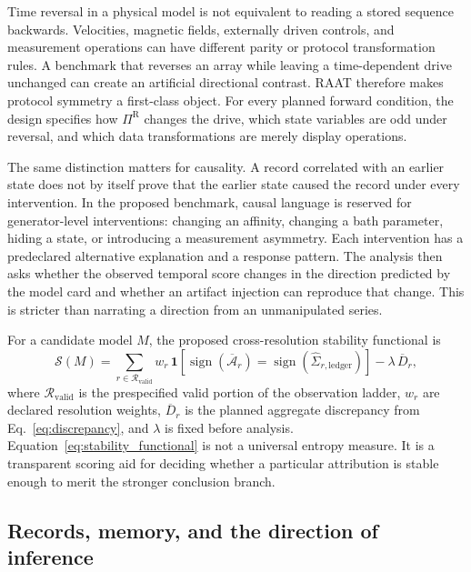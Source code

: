 Time reversal in a physical model is not equivalent to reading a stored sequence backwards. Velocities, magnetic fields, externally driven controls, and measurement operations can have different parity or protocol transformation rules. A benchmark that reverses an array while leaving a time-dependent drive unchanged can create an artificial directional contrast. RAAT therefore makes protocol symmetry a first-class object. For every planned forward condition, the design specifies how $\Pi^{\mathrm{R}}$ changes the drive, which state variables are odd under reversal, and which data transformations are merely display operations.

The same distinction matters for causality. A record correlated with an earlier state does not by itself prove that the earlier state caused the record under every intervention. In the proposed benchmark, causal language is reserved for generator-level interventions: changing an affinity, changing a bath parameter, hiding a state, or introducing a measurement asymmetry. Each intervention has a predeclared alternative explanation and a response pattern. The analysis then asks whether the observed temporal score changes in the direction predicted by the model card and whether an artifact injection can reproduce that change. This is stricter than narrating a direction from an unmanipulated series.

For a candidate model $M$, the proposed cross-resolution stability functional is
\begin{equation}
\mathcal{S}(M)=\sum_{r\in\mathcal{R}_{\mathrm{valid}}}w_r\,\mathbf{1}\!\left[\operatorname{sign}(\overline{\mathcal{A}}_r)=\operatorname{sign}(\widehat{\Sigma}_{r,\mathrm{ledger}})\right]-\lambda\,\overline{D}_r,
\label{eq:stability_functional}
\end{equation}
where $\mathcal{R}_{\mathrm{valid}}$ is the prespecified valid portion of the observation ladder, $w_r$ are declared resolution weights, $\overline{D}_r$ is the planned aggregate discrepancy from Eq.~\eqref{eq:discrepancy}, and $\lambda$ is fixed before analysis. Equation~\eqref{eq:stability_functional} is not a universal entropy measure. It is a transparent scoring aid for deciding whether a particular attribution is stable enough to merit the stronger conclusion branch.

\subsection{Records, memory, and the direction of inference}

